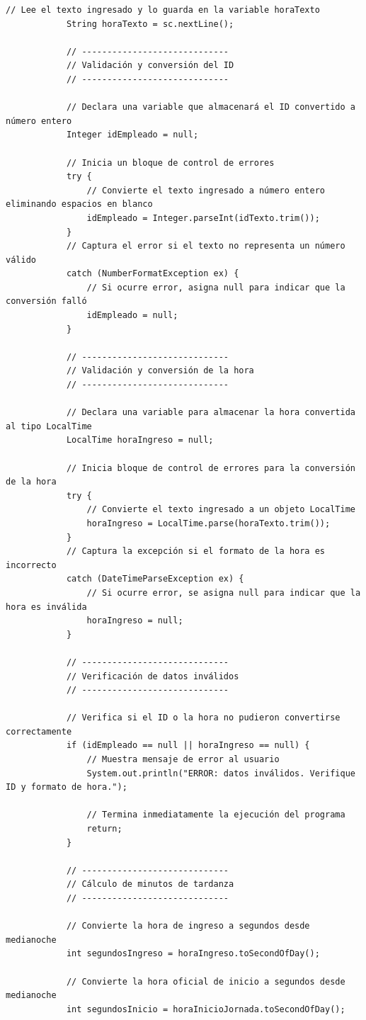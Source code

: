 \documentclass[12pt,twoside]{book}
\begin{document}
\begin{lstlisting}[style=Java,caption={Programa Java mínimo para registrar ingreso del personal (entrada por teclado).},label={lst:RegistroIngresoJavaMin}]
			// Lee el texto ingresado y lo guarda en la variable horaTexto
			String horaTexto = sc.nextLine();                         
			
			// -----------------------------
			// Validación y conversión del ID
			// -----------------------------
			
			// Declara una variable que almacenará el ID convertido a número entero
			Integer idEmpleado = null;  
			
			// Inicia un bloque de control de errores
			try {
				// Convierte el texto ingresado a número entero eliminando espacios en blanco
				idEmpleado = Integer.parseInt(idTexto.trim()); 
			} 
			// Captura el error si el texto no representa un número válido
			catch (NumberFormatException ex) {
				// Si ocurre error, asigna null para indicar que la conversión falló
				idEmpleado = null;
			}
			
			// -----------------------------
			// Validación y conversión de la hora
			// -----------------------------
			
			// Declara una variable para almacenar la hora convertida al tipo LocalTime
			LocalTime horaIngreso = null; 
			
			// Inicia bloque de control de errores para la conversión de la hora
			try {
				// Convierte el texto ingresado a un objeto LocalTime
				horaIngreso = LocalTime.parse(horaTexto.trim()); 
			} 
			// Captura la excepción si el formato de la hora es incorrecto
			catch (DateTimeParseException ex) {
				// Si ocurre error, se asigna null para indicar que la hora es inválida
				horaIngreso = null;
			}
			
			// -----------------------------
			// Verificación de datos inválidos
			// -----------------------------
			
			// Verifica si el ID o la hora no pudieron convertirse correctamente
			if (idEmpleado == null || horaIngreso == null) { 
				// Muestra mensaje de error al usuario
				System.out.println("ERROR: datos inválidos. Verifique ID y formato de hora."); 
				
				// Termina inmediatamente la ejecución del programa
				return;
			}
			
			// -----------------------------
			// Cálculo de minutos de tardanza
			// -----------------------------
			
			// Convierte la hora de ingreso a segundos desde medianoche
			int segundosIngreso = horaIngreso.toSecondOfDay();
			
			// Convierte la hora oficial de inicio a segundos desde medianoche
			int segundosInicio = horaInicioJornada.toSecondOfDay();
			

\end{lstlisting}
\end{document}
